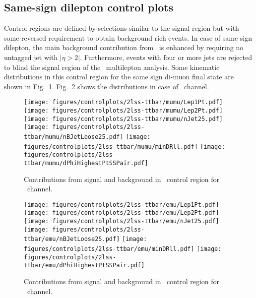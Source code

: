 
\subsection{Same-sign dilepton control plots}
Control regions are defined by selections similar to the signal region but with some reversed requirement to obtain background rich events. In case of same sign dilepton, the main background contribution from \ttbar\ is enhanced by requiring no untagged jet with $|\eta > 2|$. Furthermore, events with four or more jets are rejected to blind the signal region of the \ttH\ multilepton analysis. Some kinematic distributions in this control region for the same sign di-muon final state are shown in Fig.~\ref{fig:control_2lss_mumu}. Fig.~\ref{fig:control_2lss_emu} shows the distributions in case of \emu\ channel.
 \begin{figure} [!h]
  \centering
  \texttt{[image: figures/controlplots/2lss-ttbar/mumu/Lep1Pt.pdf]}
  \texttt{[image: figures/controlplots/2lss-ttbar/mumu/Lep2Pt.pdf]} 
  \texttt{[image: figures/controlplots/2lss-ttbar/mumu/nJet25.pdf]} \\
  \texttt{[image: figures/controlplots/2lss-ttbar/mumu/nBJetLoose25.pdf]} 
  \texttt{[image: figures/controlplots/2lss-ttbar/mumu/minDRll.pdf]}
  \texttt{[image: figures/controlplots/2lss-ttbar/mumu/dPhiHighestPtSSPair.pdf]} 
\caption{Contributions from signal and background in \ttbar\ control region for \mumu\ channel.}
\label{fig:control_2lss_mumu}
\end{figure}

 \begin{figure} [!h]
  \centering
  \texttt{[image: figures/controlplots/2lss-ttbar/emu/Lep1Pt.pdf]}
  \texttt{[image: figures/controlplots/2lss-ttbar/emu/Lep2Pt.pdf]}
  \texttt{[image: figures/controlplots/2lss-ttbar/emu/nJet25.pdf]} \\
  \texttt{[image: figures/controlplots/2lss-ttbar/emu/nBJetLoose25.pdf]}
  \texttt{[image: figures/controlplots/2lss-ttbar/emu/minDRll.pdf]}
  \texttt{[image: figures/controlplots/2lss-ttbar/emu/dPhiHighestPtSSPair.pdf]}
\caption{Contributions from signal and background in \ttbar\ control region for \emu\ channel.}
\label{fig:control_2lss_emu}
\end{figure}

